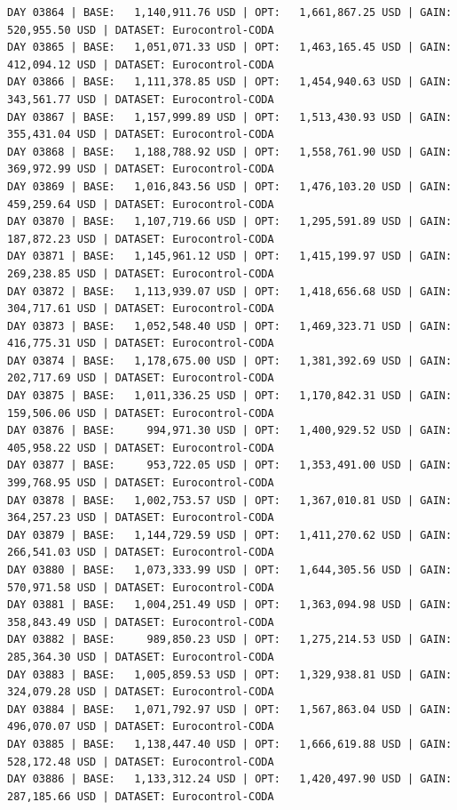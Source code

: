 \documentclass[11pt,a4paper]{article}
\begin{document}
\begin{verbatim}
DAY 03864 | BASE:   1,140,911.76 USD | OPT:   1,661,867.25 USD | GAIN: 520,955.50 USD | DATASET: Eurocontrol-CODA
DAY 03865 | BASE:   1,051,071.33 USD | OPT:   1,463,165.45 USD | GAIN: 412,094.12 USD | DATASET: Eurocontrol-CODA
DAY 03866 | BASE:   1,111,378.85 USD | OPT:   1,454,940.63 USD | GAIN: 343,561.77 USD | DATASET: Eurocontrol-CODA
DAY 03867 | BASE:   1,157,999.89 USD | OPT:   1,513,430.93 USD | GAIN: 355,431.04 USD | DATASET: Eurocontrol-CODA
DAY 03868 | BASE:   1,188,788.92 USD | OPT:   1,558,761.90 USD | GAIN: 369,972.99 USD | DATASET: Eurocontrol-CODA
DAY 03869 | BASE:   1,016,843.56 USD | OPT:   1,476,103.20 USD | GAIN: 459,259.64 USD | DATASET: Eurocontrol-CODA
DAY 03870 | BASE:   1,107,719.66 USD | OPT:   1,295,591.89 USD | GAIN: 187,872.23 USD | DATASET: Eurocontrol-CODA
DAY 03871 | BASE:   1,145,961.12 USD | OPT:   1,415,199.97 USD | GAIN: 269,238.85 USD | DATASET: Eurocontrol-CODA
DAY 03872 | BASE:   1,113,939.07 USD | OPT:   1,418,656.68 USD | GAIN: 304,717.61 USD | DATASET: Eurocontrol-CODA
DAY 03873 | BASE:   1,052,548.40 USD | OPT:   1,469,323.71 USD | GAIN: 416,775.31 USD | DATASET: Eurocontrol-CODA
DAY 03874 | BASE:   1,178,675.00 USD | OPT:   1,381,392.69 USD | GAIN: 202,717.69 USD | DATASET: Eurocontrol-CODA
DAY 03875 | BASE:   1,011,336.25 USD | OPT:   1,170,842.31 USD | GAIN: 159,506.06 USD | DATASET: Eurocontrol-CODA
DAY 03876 | BASE:     994,971.30 USD | OPT:   1,400,929.52 USD | GAIN: 405,958.22 USD | DATASET: Eurocontrol-CODA
DAY 03877 | BASE:     953,722.05 USD | OPT:   1,353,491.00 USD | GAIN: 399,768.95 USD | DATASET: Eurocontrol-CODA
DAY 03878 | BASE:   1,002,753.57 USD | OPT:   1,367,010.81 USD | GAIN: 364,257.23 USD | DATASET: Eurocontrol-CODA
DAY 03879 | BASE:   1,144,729.59 USD | OPT:   1,411,270.62 USD | GAIN: 266,541.03 USD | DATASET: Eurocontrol-CODA
DAY 03880 | BASE:   1,073,333.99 USD | OPT:   1,644,305.56 USD | GAIN: 570,971.58 USD | DATASET: Eurocontrol-CODA
DAY 03881 | BASE:   1,004,251.49 USD | OPT:   1,363,094.98 USD | GAIN: 358,843.49 USD | DATASET: Eurocontrol-CODA
DAY 03882 | BASE:     989,850.23 USD | OPT:   1,275,214.53 USD | GAIN: 285,364.30 USD | DATASET: Eurocontrol-CODA
DAY 03883 | BASE:   1,005,859.53 USD | OPT:   1,329,938.81 USD | GAIN: 324,079.28 USD | DATASET: Eurocontrol-CODA
DAY 03884 | BASE:   1,071,792.97 USD | OPT:   1,567,863.04 USD | GAIN: 496,070.07 USD | DATASET: Eurocontrol-CODA
DAY 03885 | BASE:   1,138,447.40 USD | OPT:   1,666,619.88 USD | GAIN: 528,172.48 USD | DATASET: Eurocontrol-CODA
DAY 03886 | BASE:   1,133,312.24 USD | OPT:   1,420,497.90 USD | GAIN: 287,185.66 USD | DATASET: Eurocontrol-CODA

\end{verbatim}
\end{document}

